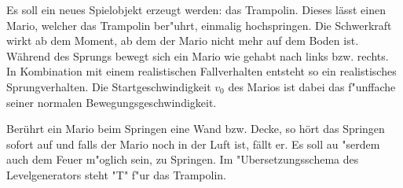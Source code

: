 Es soll ein neues Spielobjekt erzeugt werden: das Trampolin.
Dieses lässt einen Mario, welcher das Trampolin ber"uhrt, einmalig hochspringen. Die Schwerkraft wirkt ab dem Moment, ab dem der Mario nicht mehr auf dem Boden ist. 
Während des Sprungs bewegt sich ein Mario wie gehabt nach links bzw. rechts.
In Kombination mit einem realistischen Fallverhalten entsteht so ein realistisches Sprungverhalten. Die Startgeschwindigkeit $v_0$ des Marios ist dabei das f"unffache seiner normalen Bewegungsgeschwindigkeit.

Berührt ein Mario beim Springen eine Wand bzw. Decke, so hört das Springen sofort auf und falls der Mario noch in der Luft ist, fällt er.
Es soll au "serdem auch dem Feuer m"oglich sein, zu Springen.
Im "Ubersetzungsschema des Levelgenerators steht "T" f"ur das Trampolin.
